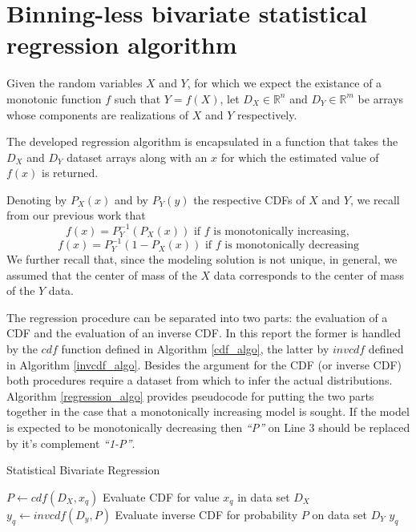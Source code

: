 \documentclass[10pt,final]{siamltex}
\begin{document}
\section{Binning-less bivariate statistical regression algorithm}
%
Given the random variables $X$ and $Y$, for which we expect the existance of a monotonic function $f$ such that $Y=f(X)$, let $D_X \in \mathbb{R}^n$ and $D_Y \in \mathbb{R}^m$ be arrays whose components are realizations of $X$ and $Y$ respectively.

The developed regression algorithm is encapsulated in a function that takes the $D_X$ and $D_Y$ dataset arrays along with an $x$ for which the estimated value of $f(x)$ is returned.

Denoting by $P_X(x)$ and by $P_Y(y)$ the respective CDFs of $X$ and $Y$, we recall from our previous \cite{fiori}\cite{fgl} work that
\begin{equation}
  f(x)=P_Y^{-1}(P_X(x)) \text{ if $f$ is monotonically increasing},
\end{equation}
\begin{equation}
  f(x)=P_Y^{-1}(1-P_X(x)) \text{ if $f$ is monotonically decreasing}
\end{equation}
We further recall that, since the modeling solution is not unique, in general, we assumed that the center of mass of the $X$ data corresponds to the center of mass of the $Y$ data.

The regression procedure can be separated into two parts: the evaluation of a CDF and the evaluation of an inverse CDF. In this report the former is handled by the $cdf$ function defined in Algorithm \ref{cdf_algo}, the latter by $invcdf$ defined in Algorithm \ref{invcdf_algo}. Besides the argument for the CDF (or inverse CDF) both procedures require a dataset from which to infer the actual distributions. Algorithm \ref{regression_algo} provides pseudocode for putting the two parts together in the case that a monotonically increasing model is sought. If the model is expected to be monotonically decreasing then \textit{``P''} on Line 3 should be replaced by it's complement \textit{``1-P''}.

\begin{algorithm}
  \caption{Statistical Bivariate Regression}
  \label{regression_algo}
  \begin{algorithmic}[1]
    \State $P \gets cdf(D_X, x_q)$
    \Comment Evaluate CDF for value $x_q$ in data set $D_X$
    \State $y_q \gets invcdf(D_y, P)$
    \Comment Evaluate inverse CDF for probability $P$ on data set $D_Y$
    \State \Return $y_q$
    \EndFunction
  \end{algorithmic}
\end{algorithm}
\end{document}
